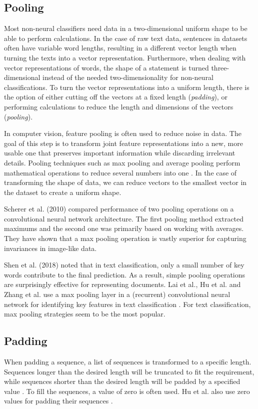 \subsection{Pooling}
Most non-neural classifiers need data in a two-dimensional uniform shape to be able to perform calculations. 
In the case of raw text data, sentences in datasets often have variable word lengths, resulting in a different vector length when turning the texts into a vector representation.
Furthermore, when dealing with vector representations of words, the shape of a statement is turned three-dimensional instead of the needed two-dimensionality for non-neural classifications.
To turn the vector representations into a uniform length, there is the option of either cutting off the vectors at a fixed length (\textit{padding}), or performing calculations to reduce the length and dimensions of the vectors (\textit{pooling}).

In computer vision, feature pooling is often used to reduce noise in data. 
The goal of this step is to transform joint feature representations into a new, more usable one that preserves important information while discarding irrelevant details.
Pooling techniques such as max pooling and average pooling perform mathematical operations to reduce several numbers into one \cite{boureau2010}. 
In the case of transforming the shape of data, we can reduce vectors to the smallest vector in the dataset to create a uniform shape.

Scherer et al. (2010) compared performance of two pooling operations on a convolutional neural network architecture. 
The first pooling method extracted maximums and the second one was primarily based on working with averages.
They have shown that a max pooling operation is vastly superior for capturing invariances in image-like data\nocite{scherer2010}.

Shen et al. (2018) noted that in text classification, only a small number of key words contribute to the final prediction.
As a result, simple pooling operations are surprisingly effective for representing documents\nocite{shen2018}.  
Lai et al., Hu et al. and Zhang et al. use a max pooling layer in a (recurrent) convolutional neural network for identifying key features in text classification \cite{lai2015,hu2014,zhang2015}. 
For text classification, max pooling strategies seem to be the most popular. 

\subsection{Padding}
When padding a sequence, a list of sequences is transformed to a specific length. 
Sequences longer than the desired length will be truncated to fit the requirement, while sequences shorter than the desired length will be padded by a specified value \cite{keraspad}. 
To fill the sequences, a value of zero is often used. Hu et al. also use zero values for padding their sequences \cite{hu2014}. 

